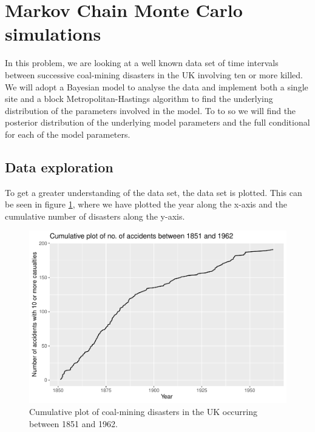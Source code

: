 \section{Markov Chain Monte Carlo simulations}


In this problem, we are looking at a well known data set of time intervals between successive coal-mining disasters in the UK involving ten or more killed. We will adopt a Bayesian model to analyse the data and implement both a single site and a block Metropolitan-Hastings algorithm to find the underlying distribution of the parameters involved in the model. To to so we will find the posterior distribution of the underlying model parameters and the full conditional for each of the model parameters. 

\subsection{Data exploration}
To get a greater understanding of the data set, the data set is plotted. This can be seen in figure \ref{fig:cumul_plot}, where we have plotted the year along the x-axis and the cumulative number of disasters along the y-axis. 

\begin{figure}[h]
    \centering
    \includegraphics[width = \textwidth]{Images/cumulative_plot_data.pdf}
    \caption{Cumulative plot of coal-mining disasters in the UK occurring between 1851 and 1962.}
    \label{fig:cumul_plot}
\end{figure}


